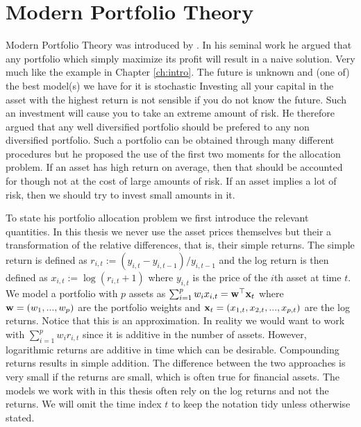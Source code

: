 \documentclass[]{book}
\begin{document}
\chapter{Modern Portfolio Theory}
Modern Portfolio Theory was introduced by \cite{markowitz1959portfolio}. 
In his seminal work he argued that any portfolio which simply maximize its profit will result in a naive solution.
Very much like the example in Chapter \ref{ch:intro}. 
The future is unknown and (one of) the best model(s) we have for it is stochastic
Investing all your capital in the asset with the highest return is not sensible if you do not know the future.
Such an investment will cause you to take an extreme amount of risk. 
He therefore argued that any well diversified portfolio should be prefered to any non diversified portfolio. 
Such a portfolio can be obtained through many different procedures but he proposed the use of the first two moments for the allocation problem.
If an asset has high return on average, then that should be accounted for though not at the cost of large amounts of risk. If an asset implies a lot of risk, then we should try to invest small amounts in it.

To state his portfolio allocation problem we first introduce the relevant quantities. In this thesis we never use the asset prices themselves but their a transformation of the relative differences, that is, their simple returns. The simple return is defined as $r_{i,t} := (y_{i,t}-y_{i,t-1})/y_{i,t-1}$ and the log return is then defined as
$
x_{i,t} := \log(r_{i,t} + 1)
$
where $y_{i,t}$ is the price of the $i$th asset at time $t$. We model a portfolio with $p$ assets as $\sum_{i=1}^p w_i x_{i,t} = \mathbf{w}^\top \mathbf{x}_t$ where $\mathbf{w}=(w_1, ..., w_p)$ are the portfolio weights and $\mathbf{x}_t=(x_{1,t},x_{2,t},..., x_{p,t})$ are the log returns. Notice that this is an approximation. In reality we would want to work with $\sum_{i=1}^p w_i r_{i,t}$ since it is additive in the number of assets. However, logarithmic returns are additive in time which can be desirable. Compounding returns results in simple addition. The difference between the two approaches is very small if the returns are small, which is often true for financial assets. The models we work with in this thesis often rely on the log returns and not the returns. We will omit the time index $t$ to keep the notation tidy unless otherwise stated. 
\end{document}
